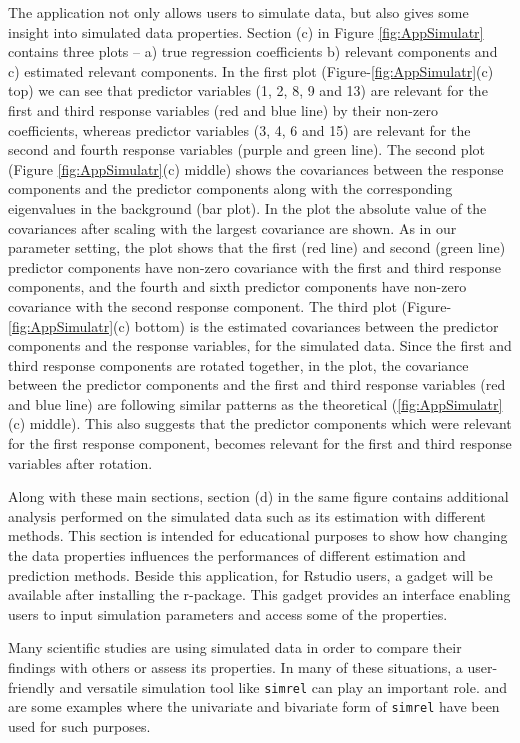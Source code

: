 \documentclass[review]{elsarticle}
\theoremstyle{definition}
\theoremstyle{definition}
\theoremstyle{definition}
\theoremstyle{remark}
\begin{document}
The application not only allows users to simulate data, but also gives
some insight into simulated data properties. Section (c) in Figure
\ref{fig:AppSimulatr} contains three plots -- a) true regression
coefficients b) relevant components and c) estimated relevant
components. In the first plot (Figure-\ref{fig:AppSimulatr}(c) top) we
can see that predictor variables (1, 2, 8, 9 and 13) are relevant for
the first and third response variables (red and blue line) by their
non-zero coefficients, whereas predictor variables (3, 4, 6 and 15) are
relevant for the second and fourth response variables (purple and green
line). The second plot (Figure \ref{fig:AppSimulatr}(c) middle) shows
the covariances between the response components and the predictor
components along with the corresponding eigenvalues in the background
(bar plot). In the plot the absolute value of the covariances after
scaling with the largest covariance are shown. As in our parameter
setting, the plot shows that the first (red line) and second (green
line) predictor components have non-zero covariance with the first and
third response components, and the fourth and sixth predictor components
have non-zero covariance with the second response component. The third
plot (Figure-\ref{fig:AppSimulatr}(c) bottom) is the estimated
covariances between the predictor components and the response variables,
for the simulated data. Since the first and third response components
are rotated together, in the plot, the covariance between the predictor
components and the first and third response variables (red and blue
line) are following similar patterns as the theoretical
(\ref{fig:AppSimulatr}(c) middle). This also suggests that the predictor
components which were relevant for the first response component, becomes
relevant for the first and third response variables after rotation.

Along with these main sections, section (d) in the same figure contains
additional analysis performed on the simulated data such as its
estimation with different methods. This section is intended for
educational purposes to show how changing the data properties influences
the performances of different estimation and prediction methods. Beside
this application, for Rstudio users, a gadget will be available after
installing the r-package. This gadget provides an interface enabling
users to input simulation parameters and access some of the properties.

Many scientific studies
\citep{helland2012near, saebo2008lpls, cook2015simultaneous} are using
simulated data in order to compare their findings with others or assess
its properties. In many of these situations, a user-friendly and
versatile simulation tool like \texttt{simrel} can play an important
role. \citet{gangsei2016theoretical} and \citet{saebo2015simrel} are
some examples where the univariate and bivariate form of \texttt{simrel}
have been used for such purposes.
\end{document}
